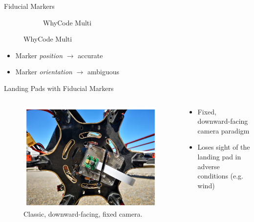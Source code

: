 \documentclass[aspectratio=169]{beamer}
\newif\ifpause
\newcommand{\mypause}{\ifpause \pause \fi}
\begin{document}
\begin{frame}{Fiducial Markers}
\begin{figure}[]
\begin{subfigure}[b]{0.23\linewidth}
		    \caption{WhyCode Multi~\cite{fiducial_precursor_evaluation}}
		\label{figure:whycode_bundle}
	    \end{subfigure}
	    \label{figure:marker_setup}
	\end{figure}
	\mypause
	\begin{itemize}
		\item Marker \emph{position} $\rightarrow$ accurate
		\item Marker \emph{orientation} $\rightarrow$ ambiguous
	\end{itemize}
	\vspace*{\fill}
\end{frame}

\begin{frame}{Landing Pads with Fiducial Markers}
\begin{columns}
	\begin{column}{0.5\textwidth}
		\begin{figure}
		\centering
		\includegraphics[width=\textwidth]{./images/wubben_drone}
		\caption{Classic, downward-facing, fixed camera.~\cite{accurate_landing_UAV_ground_pattern}}
		\label{figure:downward_facing_fixed_camera}
		\end{figure}
	\end{column}
	\begin{column}{0.5\textwidth}
	\begin{itemize}
		\item Fixed, downward-facing camera paradigm
		\item Loses sight of the landing pad in adverse conditions (e.g. wind)
	\end{itemize}
	\end{column}
\end{columns}
\end{frame}
\end{document}
